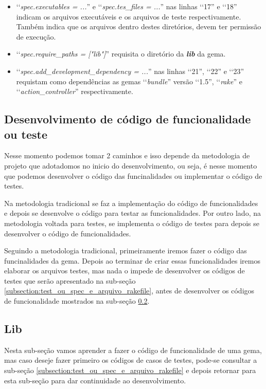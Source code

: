 \begin{itemize}
 \item ‘‘\emph{spec.executables = ...}'' e ‘‘\emph{spec.tes\_files = ...}'' nas linhas ‘‘17'' e ‘‘18'' 
 indicam os arquivos executáveis e os arquivos de teste respectivamente. Também indica que os arquivos dentro
 destes diretórios, devem ter permissão de execução.
 
 \item ‘‘\emph{spec.require\_paths = ["lib"]}'' requisita o diretório da \emph{\textbf{lib}} da gema.
 
 \item ‘‘\emph{spec.add\_development\_dependency = ...}'' nas linhas ‘‘21'', ‘‘22'' e ‘‘23'' requistam como 
 dependências as gemas ‘‘\emph{bundle}'' versão ‘‘1.5'', ‘‘\emph{rake}'' e ‘‘\emph{action\_controller}''
 respectivamente.
 
\end{itemize}

\subsection{Desenvolvimento de código de funcionalidade ou teste}
\label{subsection:desenvolvimento_de_codigo_de_funcionalidade_ou_teste}

Nesse momento podemos tomar 2 caminhos e isso depende da metodologia de projeto que adotadomos no inicio 
do desenvolvimento, ou seja, é nesse momento que podemos desenvolver o código das funcinalidades
ou implementar o código de testes. 

Na metodologia tradicional se faz a implementação do código de funcionalidades e depois se
desenvolve o código para testar as funcionalidades. Por outro lado, na metodologia voltada para 
testes, se implementa o código de testes para depois se desenvolver o código de funcionalidades.

Seguindo a metodologia tradicional, primeiramente iremos fazer o código das funcinalidades da gema.
Depois ao terminar de criar essas funcionalidades iremos elaborar os arquivos testes, mas nada o impede
de desenvolver os códigos de testes que serão apresentado na sub-seção 
\ref{subsection:test_ou_spec_e_arquivo_rakefile}, antes de desenvolver os códigos de funcionalidade
mostrados na sub-seção \ref{subsection:lib}.

\subsection{Lib}
\label{subsection:lib}

Nesta sub-seção vamos aprender a fazer o código de funcionalidade de uma gema, mas caso deseje fazer 
primeiro os códigos de casos de testes, pode-se consultar a sub-seção
\ref{subsection:test_ou_spec_e_arquivo_rakefile} e depois retornar para esta sub-seção para dar
continuidade ao desenvolvimento.

